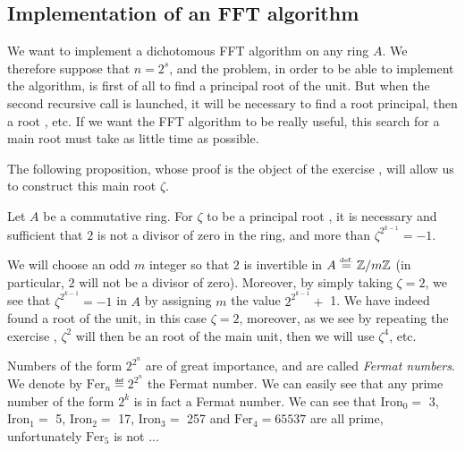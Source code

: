 \subsection{Implementation of an FFT algorithm}
\label{sect2-impl-algo-fft-ring}
 
 
  We want to implement a dichotomous FFT algorithm on any ring $ A $. We therefore suppose that $ n = 2^s $, and the problem, in order to be able to implement the algorithm, is first of all to find a  principal root of the unit. But when the second recursive call is launched, it will be necessary to find a root  principal, then a root , etc. If we want the FFT algorithm to be really useful, this search for a main root must take as little time as possible.
 
 
The following proposition, whose proof is the object of the exercise , will allow us to construct this main root $ \zeta $.
 
\begin{prop}
\label{prop-cns-square-root-ring}
Let $ A $ be a commutative ring. For $ \zeta $ to be a principal root , it is necessary and sufficient that $ 2 $ is not a divisor of zero in the ring, and more than $ \zeta^{2^{k-1}} = -1 $.
\end{prop}
We will choose an odd $ m $ integer so that $ 2 $ is invertible in $ A \stackrel{\mbox{\upshape\tiny def.}}{=} \mathbb{Z}/m \mathbb{Z} $ (in particular, $ 2 $ will not be a divisor of zero). Moreover, by simply taking $ \zeta = 2 $, we see that $ \zeta^{2^{k-1}} = -1 $ in $ A $ by assigning $ m $ the value $ 2^{2^{k-1}} + $ 1. We have indeed found a root  of the unit, in this case $ \zeta = 2 $, moreover, as we see by repeating the exercise , $ \zeta^2 $ will then be an  root of the main unit, then we will use $ \zeta^4 $, etc.
 
\begin{rem}
  \label{notation-65} Numbers of the form $ 2^{2^n} $ are of great importance, and are called \textit{Fermat numbers}. We denote by $ \text{Fer}_n \eqdef 2^{2^n} $ the  Fermat number. We can easily see that any prime number of the form $ 2^k $ is in fact a Fermat number. We can see that $ \text{Iron}_0 = $ 3, $ \text{Iron}_1 = $ 5, $ \text{Iron}_2 = $ 17, $ \text{Iron}_3 = $ 257 and $ \text{Fer}_4 = 65537 $ are all prime, unfortunately $ \text{Fer}_5 $ is not ...
\end{rem}
 
